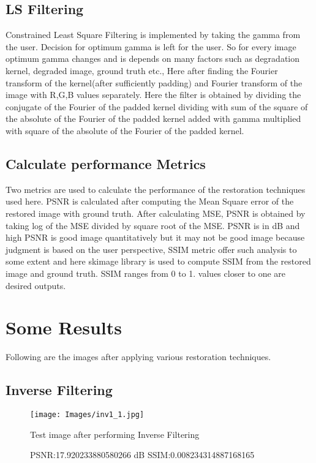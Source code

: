 \documentclass{article}
\begin{document}
\subsection{LS Filtering}
Constrained Least Square Filtering is implemented by taking the gamma from the user. Decision for optimum gamma is left for the user. So for every image optimum gamma changes and is depends on many factors such as degradation kernel, degraded image, ground truth etc., Here after finding the Fourier transform of the kernel(after sufficiently padding) and Fourier transform of the image with R,G,B values separately. Here the filter is obtained by dividing the conjugate of the Fourier of the padded kernel dividing with sum of the square of the absolute of the Fourier of the padded kernel added with gamma multiplied with square of the absolute of the Fourier of the padded kernel.

\subsection{Calculate performance Metrics}
Two metrics are used to calculate the performance of the restoration techniques used here. PSNR is calculated after computing the Mean Square error of the restored image with ground truth. After calculating MSE, PSNR is obtained by taking log of the MSE divided by square root of the MSE. PSNR is in dB and high PSNR is good image quantitatively but it may not be good image because judgment is based on the user perspective, SSIM metric offer such analysis to some extent and here skimage library is used to compute SSIM from the restored image and ground truth. SSIM ranges from 0 to 1. values closer to one are desired outputs.



\section{Some Results }
\label{sec:print}

Following are the images after applying various restoration techniques.
\subsection{Inverse Filtering}
\begin{figure}[!Hp]

\begin{minipage}[!b]{1.0\linewidth}
  \centering
  \centerline{\texttt{[image: Images/inv1\_1.jpg]}}
  \centerline{Test image after performing Inverse Filtering}\medskip
  PSNR:17.920233880580266 dB
  SSIM:0.008234314887168165
\end{minipage}
%
\end{figure}
\end{document}
